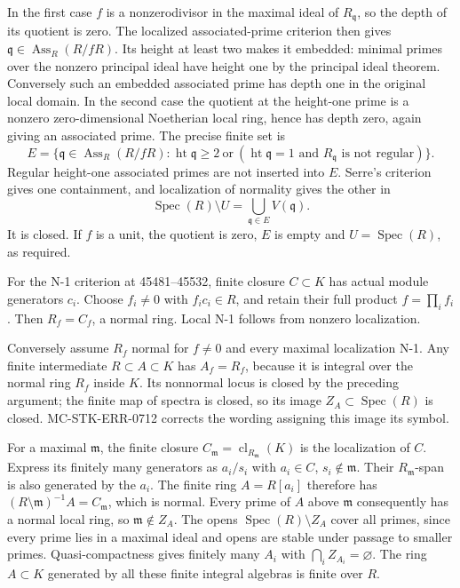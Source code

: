 In the first case \(f\) is a nonzerodivisor in the maximal ideal of \(R_{\mathfrak q}\), so the depth of its quotient is zero. The localized associated-prime criterion then gives \(\mathfrak q\in\operatorname{Ass}_R(R/fR)\). Its height at least two makes it embedded: minimal primes over the nonzero principal ideal have height one by the principal ideal theorem. Conversely such an embedded associated prime has depth one in the original local domain. In the second case the quotient at the height-one prime is a nonzero zero-dimensional Noetherian local ring, hence has depth zero, again giving an associated prime. The precise finite set is \[
 E=\{\mathfrak q\in\operatorname{Ass}_R(R/fR):
 \operatorname{ht}\mathfrak q\geq2\ \text{or}\
 (\operatorname{ht}\mathfrak q=1\text{ and }R_{\mathfrak q}\text{ is not regular})\}.
\] Regular height-one associated primes are not inserted into \(E\). Serre's criterion gives one containment, and localization of normality gives the other in \[
 \operatorname{Spec}(R)\setminus U=\bigcup_{\mathfrak q\in E}V(\mathfrak q).
\] It is closed. If \(f\) is a unit, the quotient is zero, \(E\) is empty and \(U=\operatorname{Spec}(R)\), as required.

For the N-1 criterion at 45481--45532, finite closure \(C\subset K\) has actual module generators \(c_i\). Choose \(f_i\ne0\) with \(f_ic_i\in R\), and retain their full product \(f=\prod_i f_i\). Then \(R_f=C_f\), a normal ring. Local N-1 follows from nonzero localization.

Conversely assume \(R_f\) normal for \(f\ne0\) and every maximal localization N-1. Any finite intermediate \(R\subset A\subset K\) has \(A_f=R_f\), because it is integral over the normal ring \(R_f\) inside \(K\). Its nonnormal locus is closed by the preceding argument; the finite map of spectra is closed, so its image \(Z_A\subset\operatorname{Spec}(R)\) is closed. MC-STK-ERR-0712 corrects the wording assigning this image its symbol.

For a maximal \(\mathfrak m\), the finite closure \(C_{\mathfrak m}=\operatorname{cl}_{R_{\mathfrak m}}(K)\) is the localization of \(C\). Express its finitely many generators as \(a_i/s_i\) with \(a_i\in C\), \(s_i\notin\mathfrak m\). Their \(R_{\mathfrak m}\)-span is also generated by the \(a_i\). The finite ring \(A=R[a_i]\) therefore has \((R\setminus\mathfrak m)^{-1}A=C_{\mathfrak m}\), which is normal. Every prime of \(A\) above \(\mathfrak m\) consequently has a normal local ring, so \(\mathfrak m\notin Z_A\). The opens \(\operatorname{Spec}(R)\setminus Z_A\) cover all primes, since every prime lies in a maximal ideal and opens are stable under passage to smaller primes. Quasi-compactness gives finitely many \(A_i\) with \(\bigcap_i Z_{A_i}=\varnothing\). The ring \(A\subset K\) generated by all these finite integral algebras is finite over \(R\).

